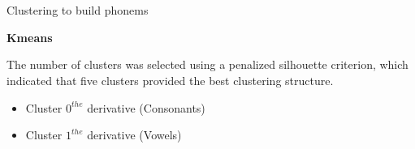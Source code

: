 \section{}
    \begin{frame}[allowframebreaks]{Clustering to build phonems}
        
        \textbf{Kmeans}
        
        The number of clusters was selected using a penalized silhouette criterion, which indicated that five clusters provided the best clustering structure.
        
        \begin{itemize}
            \item Cluster $0^{the}$ derivative (Consonants)
            \item Cluster $1^{the}$ derivative (Vowels)
        \end{itemize}
    
    \end{frame}
    
    \subsection{}
        
        
        
        